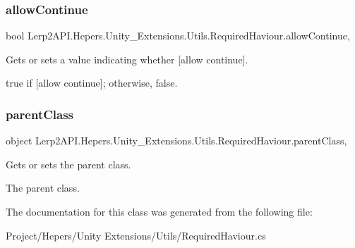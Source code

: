 \subsubsection{\texorpdfstring{allow\+Continue}{allowContinue}}
{\footnotesize\ttfamily bool Lerp2\+A\+P\+I.\+Hepers.\+Unity\+\_\+\+Extensions.\+Utils.\+Required\+Haviour.\+allow\+Continue\hspace{0.3cm}{\ttfamily [get]}, {\ttfamily [set]}}



Gets or sets a value indicating whether \mbox{[}allow continue\mbox{]}. 

{\ttfamily true} if \mbox{[}allow continue\mbox{]}; otherwise, {\ttfamily false}.\mbox{\label{class_lerp2_a_p_i_1_1_hepers_1_1_unity___extensions_1_1_utils_1_1_required_haviour_a5bb84d35fba62a59e08fbd925012ba54}} 
\subsubsection{\texorpdfstring{parent\+Class}{parentClass}}
{\footnotesize\ttfamily object Lerp2\+A\+P\+I.\+Hepers.\+Unity\+\_\+\+Extensions.\+Utils.\+Required\+Haviour.\+parent\+Class\hspace{0.3cm}{\ttfamily [get]}, {\ttfamily [set]}}



Gets or sets the parent class. 

The parent class.

The documentation for this class was generated from the following file\+:\begin{DoxyCompactItemize}
\item 
Project/\+Hepers/\+Unity Extensions/\+Utils/Required\+Haviour.\+cs\end{DoxyCompactItemize}
